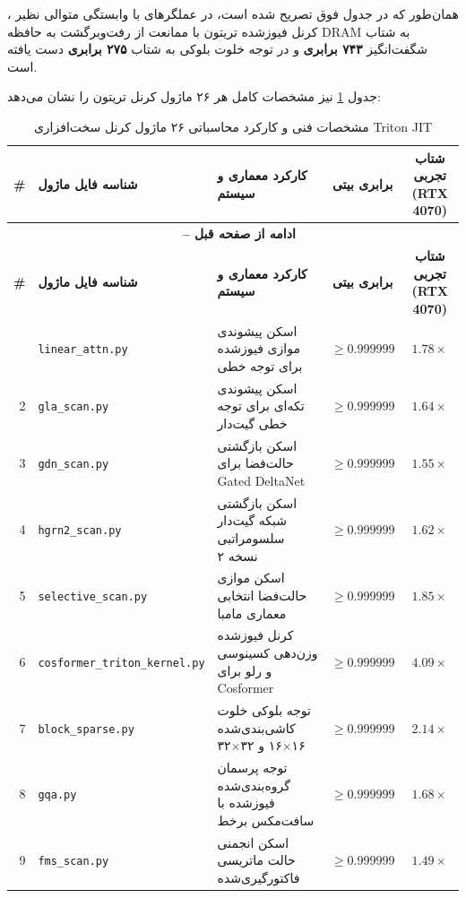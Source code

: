 همان‌طور که در جدول فوق تصریح شده است، در عملگرهای با وابستگی متوالی نظیر ، کرنل فیوزشده تریتون با ممانعت از رفت‌وبرگشت به حافظه DRAM به شتاب شگفت‌انگیز \textbf{۷۴۳ برابری} و در توجه خلوت بلوکی به شتاب \textbf{۲۷۵ برابری} دست یافته است.

جدول \ref{tab:app_triton_kernels_all} نیز مشخصات کامل هر ۲۶ ماژول کرنل تریتون را نشان می‌دهد:

\begin{center}
\scriptsize
\setlength{\tabcolsep}{3pt}
\begin{longtable}{r p{} p{} c c}
\caption{مشخصات فنی و کارکرد محاسباتی ۲۶ ماژول کرنل سخت‌افزاری Triton JIT}\label{tab:app_triton_kernels_all}\\
\toprule
\textbf{\#} & \textbf{شناسه فایل ماژول} & \textbf{کارکرد معماری و سیستم} & \textbf{برابری بیتی} & \textbf{شتاب تجربی (RTX 4070)} \\
\midrule
\endfirsthead
\multicolumn{5}{c}{{\bfseries \tablename\ \thetable{} -- ادامه از صفحه قبل}} \\
\toprule
\textbf{\#} & \textbf{شناسه فایل ماژول} & \textbf{کارکرد معماری و سیستم} & \textbf{برابری بیتی} & \textbf{شتاب تجربی (RTX 4070)} \\
\midrule
\endhead
\bottomrule
\endfoot
1 & \texttt{linear\_attn.py} & اسکن پیشوندی موازی فیوزشده برای توجه خطی & $\ge 0.999999$ & $1.78\times$ \\
2 & \texttt{gla\_scan.py} & اسکن پیشوندی تکه‌ای برای توجه خطی گیت‌دار & $\ge 0.999999$ & $1.64\times$ \\
3 & \texttt{gdn\_scan.py} & اسکن بازگشتی حالت‌فضا برای Gated DeltaNet & $\ge 0.999999$ & $1.55\times$ \\
4 & \texttt{hgrn2\_scan.py} & اسکن بازگشتی شبکه گیت‌دار سلسومراتبی نسخه ۲ & $\ge 0.999999$ & $1.62\times$ \\
5 & \texttt{selective\_scan.py} & اسکن موازی حالت‌فضا انتخابی معماری مامبا & $\ge 0.999999$ & $1.85\times$ \\
6 & \texttt{cosformer\_triton\_kernel.py} & کرنل فیوزشده وزن‌دهی کسینوسی و رلو برای Cosformer & $\ge 0.999999$ & $4.09\times$ \\
7 & \texttt{block\_sparse.py} & توجه بلوکی خلوت کاشی‌بندی‌شده ۱۶×۱۶ و ۳۲×۳۲ & $\ge 0.999999$ & $2.14\times$ \\
8 & \texttt{gqa.py} & توجه پرسمان گروه‌بندی‌شده فیوزشده با سافت‌مکس برخط & $\ge 0.999999$ & $1.68\times$ \\
9 & \texttt{fms\_scan.py} & اسکن انجمنی حالت ماتریسی فاکتورگیری‌شده & $\ge 0.999999$ & $1.49\times$ \\

\end{longtable}
\end{center}
